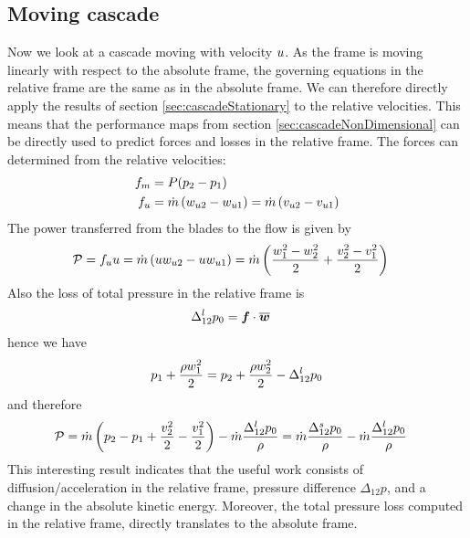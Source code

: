 \subsection{Moving cascade}
\label{sec:cascadeMoving}

Now we look at a cascade moving with velocity $u$. As the frame is
moving linearly with respect to the absolute frame, the governing
equations in the relative frame are the same as in the absolute
frame. We can therefore directly apply the results of section
\ref{sec:cascadeStationary} to the relative velocities. This means
that the performance maps from section \ref{sec:cascadeNonDimensional}
can be directly used to predict forces and losses in the relative
frame. The forces can determined from the relative velocities:
\begin{align*}
  f_m &= P (p_2 - p_1) \\
  f_{u} &= \dot m \left(w_{u 2} - w_{u 1}\right) 
  = \dot m \left(v_{u 2} - v_{u 1}\right) 
\end{align*}
The power transferred from the blades to the flow is given by
\begin{align*}
  \mathcal P 
  &= f_{u} u 
  = \dot m \left(u w_{u 2} - u w_{u 1}\right) 
  = \dot m 
  \left(
    \frac{w_1^2 - w_2^2}{2} + 
    \frac{v_2^2 - v_1^2}{2} \right)
\end{align*}
Also the loss of total pressure in the relative frame is
\begin{align*}
  \Delta_{12}^l p_{0} &= \boldsymbol {f} \cdot \overline{\boldsymbol {w}}
\end{align*}
hence we have
\begin{align*}
  p_1 + \frac{\rho w_1^2}{2} = 
  p_2 + \frac{\rho w_2^2}{2} - \Delta_{12}^l p_{0}
\end{align*}
and therefore
\begin{align*}
  \mathcal P &= \dot m \left( p_2 - p_1 + \frac{v_2^2}{2} -
    \frac{v_1^2}{2} \right)
  - \dot m \frac{\Delta_{12}^l p_{0}}{\rho} = \dot m \frac{\Delta_{12}^s p_{0}}{\rho} - \dot m \frac{\Delta_{12}^l
    p_{0}}{\rho}
\end{align*}
This interesting result indicates that the useful work consists of
diffusion/acceleration in the relative frame, \ie pressure difference
$\Delta_{12} p$, and a change in the absolute kinetic energy. Moreover, the
total pressure loss computed in the relative frame, directly
translates to the absolute frame.

